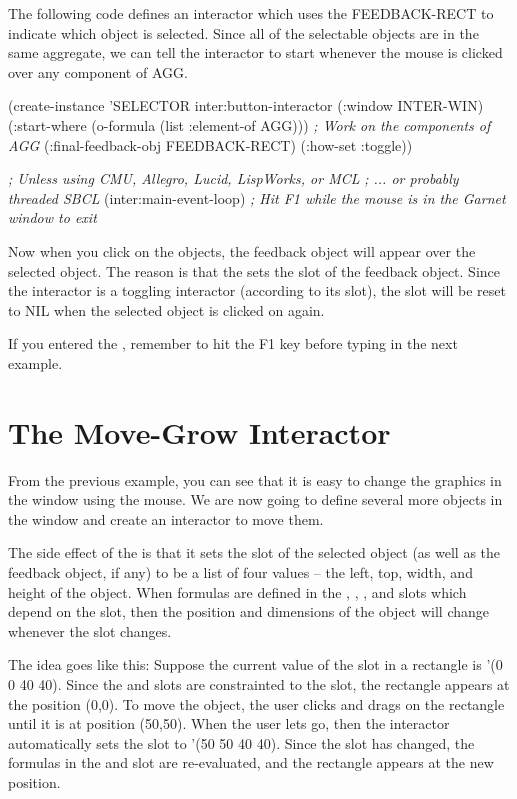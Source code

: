 The following code defines an interactor which uses the FEEDBACK-RECT
to indicate which object is selected.  Since all of the selectable
objects are in the same aggregate, we can tell the interactor to start
whenever the mouse is clicked over any component of AGG.

\begin{programexample}
(create-instance 'SELECTOR inter:button-interactor
   (:window INTER-WIN)
   (:start-where (o-formula (list :element-of AGG)))  {\it ; Work on the components of AGG}
   (:final-feedback-obj FEEDBACK-RECT)
   (:how-set :toggle))

{\it ; Unless using CMU, Allegro, Lucid, LispWorks, or MCL} 
\textit{; ... or probably threaded SBCL}
(inter:main-event-loop)
{\it ; Hit F1 while the mouse is in the Garnet window to exit}
\end{programexample}

Now when you click on the objects, the feedback object will appear
over the selected object.  The reason is that the
 sets the  slot of the feedback
object.  Since the interactor is a toggling
interactor (according to its  slot), the 
slot will be reset to NIL when the selected object is clicked on again.

If you entered the , remember to hit the F1 key
before typing in the next example.


\section{The Move-Grow Interactor}

From the previous example, you can see that it is easy to change the
graphics in the window using the mouse.  We are now going to define several
more objects in the window and create an interactor to move them.

The side effect of the  is that it sets the
 slot of the selected object (as well as the feedback object,
if any) to be a list of four values -- the left, top, width, and
height of the object.  When formulas are defined in the ,
, , and  slots which depend on
the  slot, then the position and dimensions of the
object will change whenever the  slot changes.

The idea goes like this:  Suppose the current value of the 
slot in a rectangle is '(0 0 40 40).  Since the  and
 slots are constrainted to the  slot, the rectangle
appears at the position (0,0).  To move the object, the user clicks
and drags on the rectangle until it is at position (50,50).  When the
user lets go, then the interactor automatically sets the 
slot to '(50 50 40 40).  Since the  slot has changed, the
formulas in the  and  slot are re-evaluated, and
the rectangle appears at the new position.

